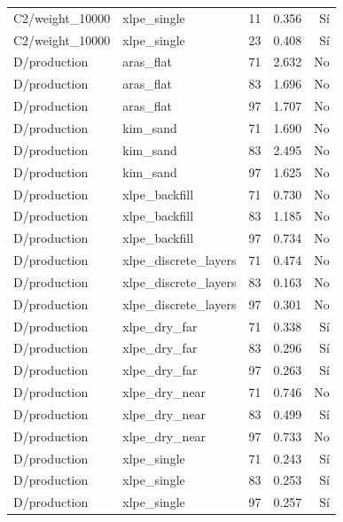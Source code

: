 \begin{longtable}{L{4cm}L{3.5cm}rrr}
C2/weight\_10000 & xlpe\_single & 11 & 0.356 & Sí\\
C2/weight\_10000 & xlpe\_single & 23 & 0.408 & Sí\\
D/production & aras\_flat & 71 & 2.632 & No\\
D/production & aras\_flat & 83 & 1.696 & No\\
D/production & aras\_flat & 97 & 1.707 & No\\
D/production & kim\_sand & 71 & 1.690 & No\\
D/production & kim\_sand & 83 & 2.495 & No\\
D/production & kim\_sand & 97 & 1.625 & No\\
D/production & xlpe\_backfill & 71 & 0.730 & No\\
D/production & xlpe\_backfill & 83 & 1.185 & No\\
D/production & xlpe\_backfill & 97 & 0.734 & No\\
D/production & xlpe\_discrete\_layers & 71 & 0.474 & No\\
D/production & xlpe\_discrete\_layers & 83 & 0.163 & No\\
D/production & xlpe\_discrete\_layers & 97 & 0.301 & No\\
D/production & xlpe\_dry\_far & 71 & 0.338 & Sí\\
D/production & xlpe\_dry\_far & 83 & 0.296 & Sí\\
D/production & xlpe\_dry\_far & 97 & 0.263 & Sí\\
D/production & xlpe\_dry\_near & 71 & 0.746 & No\\
D/production & xlpe\_dry\_near & 83 & 0.499 & Sí\\
D/production & xlpe\_dry\_near & 97 & 0.733 & No\\
D/production & xlpe\_single & 71 & 0.243 & Sí\\
D/production & xlpe\_single & 83 & 0.253 & Sí\\
D/production & xlpe\_single & 97 & 0.257 & Sí\\
\bottomrule\end{longtable}\endgroup
